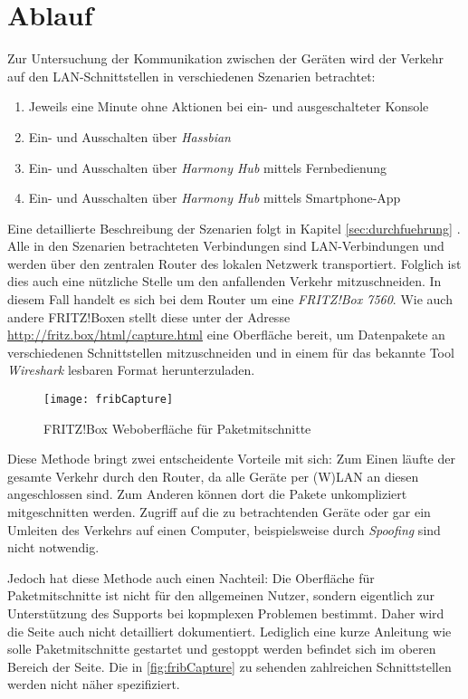 \newpage
\section{Ablauf}\label{sec:ablauf}
Zur Untersuchung der Kommunikation zwischen der Geräten wird der Verkehr auf den LAN-Schnittstellen in verschiedenen Szenarien betrachtet:

\begin{enumerate}
    \setlength\itemsep{-0.5em}
    \item Jeweils eine Minute ohne Aktionen bei ein- und ausgeschalteter Konsole
    \item Ein- und Ausschalten über \textit{Hassbian}
    \item Ein- und Ausschalten über \textit{Harmony Hub} mittels Fernbedienung
    \item Ein- und Ausschalten über \textit{Harmony Hub} mittels Smartphone-App
\end{enumerate}

Eine detaillierte Beschreibung der Szenarien folgt in Kapitel \ref{sec:durchfuehrung} \textit{}.
Alle in den Szenarien betrachteten Verbindungen sind LAN-Verbindungen und werden über den zentralen Router des lokalen Netzwerk transportiert.
Folglich ist dies auch eine nützliche Stelle um den anfallenden Verkehr mitzuschneiden.
In diesem Fall handelt es sich bei dem Router um eine \textit{FRITZ!Box 7560}\cite{FRITZBox29:online}.
Wie auch andere FRITZ!Boxen stellt diese unter der Adresse \url{http://fritz.box/html/capture.html} eine Oberfläche bereit,
um Datenpakete an verschiedenen Schnittstellen mitzuschneiden
und in einem für das bekannte Tool \textit{Wireshark} lesbaren Format herunterzuladen.

\begin{figure}[ht!]
    \centering
    \texttt{[image: fribCapture]}
    \caption{FRITZ!Box Weboberfläche für Paketmitschnitte}\label{fig:fribCapture}
\end{figure}

Diese Methode bringt zwei entscheidente Vorteile mit sich:
Zum Einen läufte der gesamte Verkehr durch den Router, da alle Geräte per (W)LAN an diesen angeschlossen sind.
Zum Anderen können dort die Pakete unkompliziert mitgeschnitten werden. Zugriff auf die zu betrachtenden Geräte
oder gar ein Umleiten des Verkehrs auf einen Computer, beispielsweise durch \textit{Spoofing}\cite{Maninthe12:online} sind nicht notwendig.

Jedoch hat diese Methode auch einen Nachteil:
Die Oberfläche für Paketmitschnitte ist nicht für den allgemeinen Nutzer,
sondern eigentlich zur Unterstützung des Supports bei kopmplexen Problemen bestimmt.
Daher wird die Seite auch nicht detailliert dokumentiert.
Lediglich eine kurze Anleitung wie solle Paketmitschnitte gestartet und gestoppt werden befindet sich im oberen Bereich der Seite.
Die in \autoref{fig:fribCapture} zu sehenden zahlreichen Schnittstellen werden nicht näher spezifiziert.


